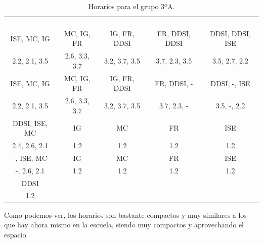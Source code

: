 \begin{table}[H]
\begin{center}
\begin{tabular}{|c|c|c|c|c|}
\hline
 & & & & \\
\hline
& & & & \\
\hline
& & & & \\
\hline
& & & & \\
\hline
& & & & \\
\hline
ISE,  MC,  IG & MC, IG,  FR & IG, FR,  DDSI & FR, DDSI,  DDSI & DDSI, DDSI,  ISE \\
2.2,  2.1,  3.5 & 2.6,  3.3,  3.7 & 3.2,  3.7,  3.5 & 3.7,  2.3,  3.5 & 3.5,  2.7,  2.2 \\
\hline
ISE,  MC,  IG & MC, IG, FR & IG, FR, DDSI & FR, DDSI, - & DDSI, -, ISE \\
2.2,  2.1,  3.5 & 2.6,  3.3,  3.7 & 3.2,  3.7,  3.5 & 3.7,  2.3,  - & 3.5,  -,  2.2 \\
\hline
DDSI, ISE, MC & IG & MC & FR & ISE\\
2.4, 2.6, 2.1  & 1.2 & 1.2 & 1.2 & 1.2 \\
\hline
-, ISE, MC & IG & MC & FR & ISE\\
-, 2.6, 2.1  & 1.2 & 1.2 & 1.2 & 1.2 \\
\hline
DDSI & & & &\\
1.2 & & & & \\
\hline
\end{tabular}
\end{center}
\caption{Horarios para el grupo 3ºA.}
\label{resultado2}
\end{table}

Como podemos ver, los horarios son bastante compactos y muy similares a los que hay ahora mismo en la escuela, siendo muy compactos y aprovechando el espacio.
